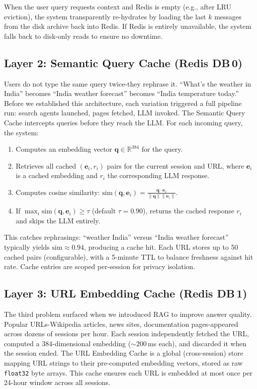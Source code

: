 \documentclass[conference]{IEEEtran}
\begin{document}
When the user query requests context and Redis is empty (e.g., after LRU eviction), the system transparently re-hydrates by loading the last $k$ messages from the disk archive back into Redis. If Redis is entirely unavailable, the system falls back to disk-only reads to ensure no downtime.

\subsection{Layer 2: Semantic Query Cache (Redis DB\,0)}

Users do not type the same query twice-they rephrase it. ``What's the weather in India'' becomes ``India weather forecast'' becomes ``India temperature today.'' Before we established this architecture, each variation triggered a full pipeline run: search agents launched, pages fetched, LLM invoked. The Semantic Query Cache intercepts queries before they reach the LLM. For each incoming query, the system:

\begin{enumerate}
\item Computes an embedding vector $\mathbf{q} \in \mathbb{R}^{384}$ for the query.
\item Retrieves all cached $(\mathbf{e}_i, r_i)$ pairs for the current session and URL, where $\mathbf{e}_i$ is a cached embedding and $r_i$ the corresponding LLM response.
\item Computes cosine similarity: $\text{sim}(\mathbf{q}, \mathbf{e}_i) = \frac{\mathbf{q} \cdot \mathbf{e}_i}{\|\mathbf{q}\| \|\mathbf{e}_i\|}$.
\item If $\max_i \text{sim}(\mathbf{q}, \mathbf{e}_i) \geq \tau$ (default $\tau{=}0.90$), returns the cached response $r_i$ and skips the LLM entirely.
\end{enumerate}

This catches rephrasings: ``weather India'' versus ``India weather forecast'' typically yields $\text{sim} \approx 0.94$, producing a cache hit. Each URL stores up to 50 cached pairs (configurable), with a 5-minute TTL to balance freshness against hit rate. Cache entries are scoped per-session for privacy isolation.

\subsection{Layer 3: URL Embedding Cache (Redis DB\,1)}

The third problem surfaced when we introduced RAG to improve answer quality. Popular URLs-Wikipedia articles, news sites, documentation pages-appeared across dozens of sessions per hour. Each session independently fetched the URL, computed a 384-dimensional embedding (${\sim}200$\,ms each), and discarded it when the session ended. The URL Embedding Cache is a global (cross-session) store mapping URL strings to their pre-computed embedding vectors, stored as raw \texttt{float32} byte arrays. This cache ensures each URL is embedded at most once per 24-hour window across all sessions.
\end{document}
